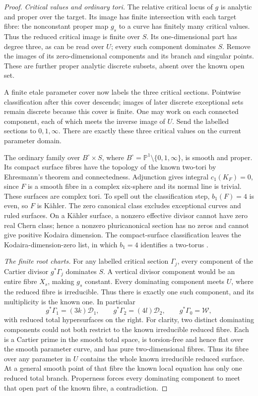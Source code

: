 \begin{proof}
\emph{Critical values and ordinary tori.}
The relative critical locus of $g$ is analytic
and proper over the target.  Its image has
finite intersection with each target fibre:
the nonconstant proper map $g_s$ to a curve
has finitely many critical values.  Thus the
reduced critical image is finite over $S$.
Its one-dimensional part has degree three,
as can be read over $U$; every such component
dominates $S$.  Remove the images of its
zero-dimensional components and its branch
and singular points.  These are further
proper analytic discrete subsets, absent
over the known open set.

A finite etale parameter cover now labels
the three critical sections.  Pointwise
classification after this cover descends;
images of later discrete exceptional sets
remain discrete because this cover is finite.
One may work on each connected component,
each of which meets the inverse image of $U$.
Send the labelled sections to $0,1,\infty$.
There are exactly these three critical values
on the current parameter domain.

The ordinary family over
$B^\circ\times S$, where
$B^\circ=\mathbb P^1\setminus\{0,1,\infty\}$,
is smooth and proper.  Its compact surface
fibres have the topology of the known two-tori
by Ehresmann's theorem and connectedness.
Adjunction gives integral $c_1(K_F)=0$,
since $F$ is a smooth fibre in a complex
six-sphere and its normal line is trivial.
These surfaces are complex tori.  To spell
out the classification step, $b_1(F)=4$
is even, so $F$ is K\"ahler.  The zero
canonical class excludes exceptional curves
and ruled surfaces.  On a K\"ahler surface,
a nonzero effective divisor cannot have
zero real Chern class; hence a nonzero
pluricanonical section has no zeros and
cannot give positive Kodaira dimension.
The compact-surface classification leaves
the Kodaira-dimension-zero list, in which
$b_1=4$ identifies a two-torus
\cite[Chapter~VI, Theorem~1.1 and Table~10]{BHPV2004E}.

\emph{The finite root charts.}
For any labelled critical section $\Gamma_j$,
every component of the Cartier divisor $g^*\Gamma_j$
dominates $S$.  A vertical divisor component would
be an entire fibre $X_s$, making $g_s$ constant.
Every dominating component meets $U$, where the
reduced fibre is irreducible.  Thus there is
exactly one such component, and its multiplicity
is the known one.  In particular
\[
 g^*\Gamma_1=(3k)\mathcal D_1,
 \qquad g^*\Gamma_2=(4l)\mathcal D_2,
 \qquad g^*\Gamma_0=\mathcal W,
 \tag{E.2.22.3}
\]
with reduced total hypersurfaces on the right.
For clarity, two distinct dominating components
could not both restrict to the known irreducible
reduced fibre.  Each is a Cartier prime in
the smooth total space, is torsion-free and
hence flat over the smooth parameter curve,
and has pure two-dimensional fibres.  Thus
its fibre over any parameter in $U$ contains
the whole known irreducible reduced surface.
At a general smooth point of
that fibre the known local equation has only
one reduced total branch.  Properness forces
every dominating component to meet that open
part of the known fibre, a contradiction.


\end{proof}

